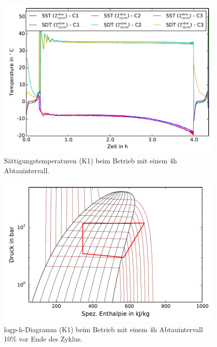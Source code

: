 \begin{figure}[h!]
\centering
\includegraphics[scale=0.8]{Pictures/50/Tsats_lastCycle.pdf}
\caption{Sättigungstemperaturen (K1) beim Betrieb mit einem 4h Abtauintervall.}
\label{fig:Tsats50}
\end{figure}

\begin{figure}[h!]
\centering
\includegraphics[scale=0.8]{Pictures/50/log_ph_lastCycle10perc_C1.pdf}
\caption{logp-h-Diagramm (K1) beim Betrieb mit einem 4h Abtauintervall \unit{10}{\%} vor Ende des Zyklus.}
\label{fig:logph50}
\end{figure}

